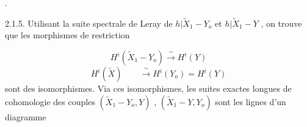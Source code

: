 \begin{center}
\quad .
\end{center}
2.1.5. Utilisant la suite spectrale de Leray de $h|\widetilde{X}_1-Y_o$ et $h|\widetilde{X}_1-Y$ , on trouve que les morphismes de restriction

\begin{equation*}
H^i(\widetilde{X}_1-Y_o) \xrightarrow{\ \sim\ } H^i(Y)
\end{equation*}
\begin{equation*}
H^i(\widetilde{X}) \qquad \xrightarrow{\ \sim\ } H^i(Y_o) = H^i(Y)
\end{equation*}
sont des isomorphismes. Via ces isomorphismes, les suites exactes longues de cohomologie des couples $(\widetilde{X}_1-Y_o,Y)$ , $(\widetilde{X}_1-Y,Y_o)$ sont les lignes d'un diagramme 



